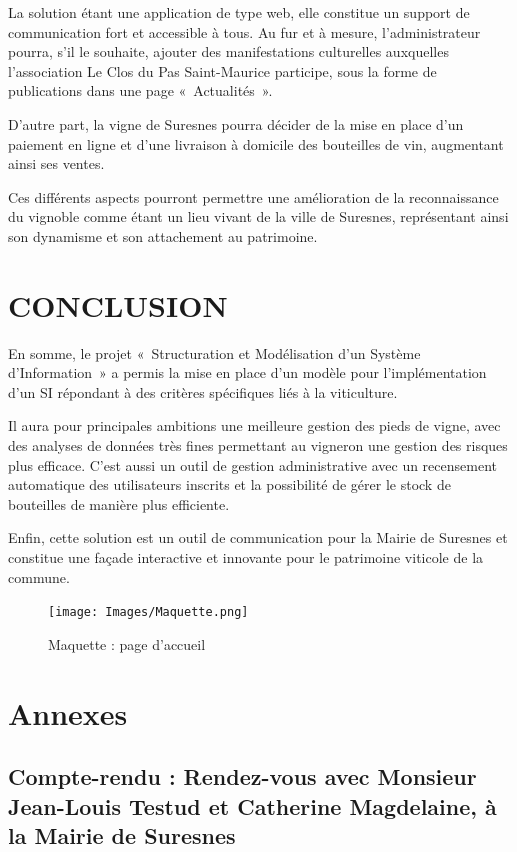 \documentclass[a4paper, titlepage]{report}
\begin{document}
La solution étant une application de type web, elle constitue un support
de communication fort et accessible à tous. Au fur et à mesure,
l'administrateur pourra, s'il le souhaite, ajouter des manifestations
culturelles auxquelles l'association Le Clos du Pas Saint-Maurice
participe, sous la forme de publications dans une page «~Actualités~».

D'autre part, la vigne de Suresnes pourra décider de la mise en place
d'un paiement en ligne et d'une livraison à domicile des bouteilles de
vin, augmentant ainsi ses ventes.

Ces différents aspects pourront permettre une amélioration de la
reconnaissance du vignoble comme étant un lieu vivant de la ville de
Suresnes, représentant ainsi son dynamisme et son attachement au
patrimoine.


\chapter{CONCLUSION}

En somme, le projet «~Structuration et Modélisation d'un Système
d'Information~» a permis la mise en place d'un modèle pour
l'implémentation d'un SI répondant à des critères spécifiques liés à la
viticulture.

Il aura pour principales ambitions une meilleure gestion des pieds de
vigne, avec des analyses de données très fines permettant au vigneron
une gestion des risques plus efficace. C'est aussi un outil de gestion
administrative avec un recensement automatique des utilisateurs inscrits
et la possibilité de gérer le stock de bouteilles de manière plus
efficiente.

Enfin, cette solution est un outil de communication pour la Mairie de
Suresnes et constitue une façade interactive et innovante pour le
patrimoine viticole de la commune.

\clearpage
\begin{figure}[!ht]
\centering
\texttt{[image: Images/Maquette.png]}
\caption{Maquette : page d'accueil}
\end{figure}

\appendix

\chapter{Annexes}
\section{Compte-rendu : Rendez-vous avec Monsieur Jean-Louis Testud et Catherine Magdelaine, à la Mairie de Suresnes}
\end{document}
